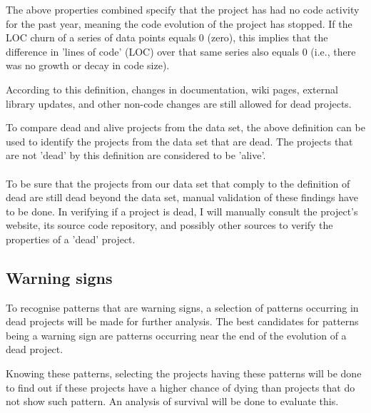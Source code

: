 \noindent
The above properties combined specify that the project has had no code activity
for the past year, meaning the code evolution of the project has stopped. If the
LOC churn of a series of data points equals 0 (zero), this implies that the
difference in 'lines of code' (LOC) over that same series also equals 0 (i.e.,
there was no growth or decay in code size).

According to this definition, changes in documentation, wiki pages, external
library updates, and other non-code changes are still allowed for dead
projects.

To compare dead and alive projects from the data set, the above definition can
be used to identify the projects from the data set that are dead. The projects
that are not 'dead' by this definition are considered to be 'alive'.

\paragraph{}
To be sure that the projects from our data set that comply to the definition of
dead are still dead beyond the data set, manual validation of these findings
have to be done. In verifying if a project is dead, I will manually consult the
project's website, its source code repository, and possibly other sources to
verify the properties of a 'dead' project.

\subsection{Warning signs}
To recognise patterns that are warning signs, a selection of patterns occurring
in dead projects will be made for further analysis. The best candidates for
patterns being a warning sign are patterns occurring near the end of the
evolution of a dead project.

Knowing these patterns, selecting the projects having these patterns will be
done to find out if these projects have a higher chance of dying than projects
that do not show such pattern. An analysis of survival will be done to evaluate
this.

\begin{comment}
- The plan
- Methodology / method per question
- Hypotheses
- Validation

This section describes the methods used to answer the research questions. A
good structure of this section often follows the sub questions by providing a
method for each.

The research method can be based on the “Scientific method”, but more creative
solutions could be defined as well. In any case, the method needs a thorough
motivation grounded in theory in order to be acceptable.

As part of the method a number of hypotheses are described. These hypotheses
will be tested by the research, using the methods described here.

An important part of this section is validation. How will you evaluate and
validate the outcomes of the research? You can look at Paul Klint’s homepage
for examples of this section as
well\footnote{http://homepages.cwi.nl/~paulk/thesesMasterSoftwareEngineering/2006/RichardKettelerij.pdf}.
\end{comment}